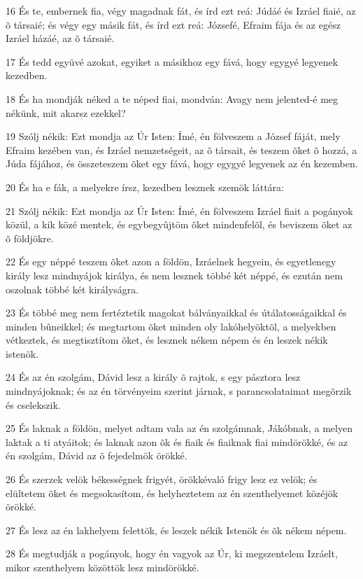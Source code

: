 \par 16 És te, embernek fia, végy magadnak fát, és írd ezt reá: Júdáé és Izráel fiaié, az õ társaié; és végy egy másik fát, és írd ezt reá: Józsefé, Efraim fája és az egész Izráel házáé, az õ társaié.
\par 17 És tedd együvé azokat, egyiket a másikhoz egy fává, hogy egygyé legyenek kezedben.
\par 18 És ha mondják néked a te néped fiai, mondván: Avagy nem jelented-é meg nékünk, mit akarsz ezekkel?
\par 19 Szólj nékik: Ezt mondja az Úr Isten: Ímé, én fölveszem a József fáját, mely Efraim kezében van, és Izráel nemzetségeit, az õ társait, és teszem õket õ hozzá, a Júda fájához, és összeteszem õket egy fává, hogy egygyé legyenek az én kezemben.
\par 20 És ha e fák, a melyekre írsz, kezedben lesznek szemök láttára:
\par 21 Szólj nékik: Ezt mondja az Úr Isten: Ímé, én fölveszem Izráel fiait a pogányok közül, a kik közé mentek, és egybegyûjtöm õket mindenfelõl, és beviszem õket az õ földjökre.
\par 22 És egy néppé teszem õket azon a földön, Izráelnek hegyein, és egyetlenegy király lesz  mindnyájok királya, és nem lesznek többé két néppé, és ezután nem oszolnak többé két királyságra.
\par 23 És többé meg nem fertéztetik magokat bálványaikkal és útálatosságaikkal és minden bûneikkel; és megtartom õket minden oly lakóhelyöktõl, a melyekben vétkeztek, és megtisztítom õket, és lesznek nékem népem és én leszek nékik istenök.
\par 24 És az én szolgám, Dávid lesz a király õ rajtok, s egy pásztora lesz mindnyájoknak; és az én törvényeim szerint járnak, s parancsolataimat megõrzik és cselekszik.
\par 25 És laknak a földön, melyet adtam vala az én szolgámnak, Jákóbnak, a melyen laktak a ti atyáitok; és laknak azon õk és fiaik és fiaiknak fiai mindörökké, és az én szolgám, Dávid az õ fejedelmök örökké.
\par 26 És szerzek velök békességnek frigyét, örökkévaló frigy lesz ez velök; és elültetem õket és megsokasítom, és helyheztetem az én szenthelyemet közéjök örökké.
\par 27 És lesz az én lakhelyem felettök, és leszek nékik Istenök és õk nékem népem.
\par 28 És megtudják a pogányok, hogy én vagyok az Úr, ki megszentelem Izráelt, mikor szenthelyem közöttök lesz mindörökké.

